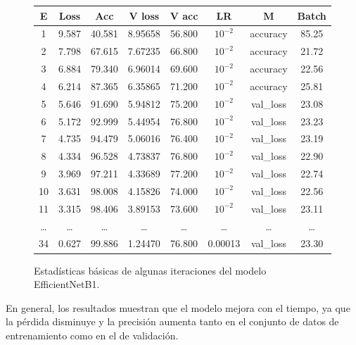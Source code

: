     \begin{figure}[ht]
      \small
      \begin{center}
          \begin{tabular}{|c|c|c|c|c|c|c|c|} \hline
          E & Loss & Acc & V loss & V acc & LR & M & Batch \\ \hline
          1 & 9.587 & 40.581 & 8.95658 & 56.800 & $10^{-2}$ & accuracy & 85.25 \\ \hline
          2 & 7.798 & 67.615 & 7.67235 & 66.800 & $10^{-2}$ & accuracy & 21.72 \\ \hline
          3 & 6.884 & 79.340 & 6.96014 & 69.600 & $10^{-2}$ & accuracy & 22.56 \\ \hline
          4 & 6.214 & 87.365 & 6.35865 & 71.200 & $10^{-2}$ & accuracy & 25.81 \\ \hline
          5 & 5.646 & 91.690 & 5.94812 & 75.200 & $10^{-2}$ & val\_loss & 23.08 \\ \hline
          6 & 5.172 & 92.999 & 5.44954 & 76.800 & $10^{-2}$ & val\_loss & 23.23 \\ \hline
          7 & 4.735 & 94.479 & 5.06016 & 76.400 & $10^{-2}$ & val\_loss & 23.19 \\ \hline
          8 & 4.334 & 96.528 & 4.73837 & 76.800 & $10^{-2}$ & val\_loss & 22.90 \\ \hline
          9 & 3.969 & 97.211 & 4.33689 & 77.200 & $10^{-2}$ & val\_loss & 22.74 \\ \hline
          10 & 3.631 & 98.008 & 4.15826 & 74.000 & $10^{-2}$ & val\_loss & 22.56 \\ \hline
          11 & 3.315 & 98.406 & 3.89153 & 73.600 & $10^{-2}$ & val\_loss & 23.11 \\ \hline
          \dots & \dots & \dots & \dots & \dots & \dots & \dots & \dots \\ \hline
          34 & 0.627 & 99.886 & 1.24470 & 76.800 & 0.00013 & val\_loss & 23.30 \\ \hline
          \end{tabular}
          \caption{Estadísticas básicas de algunas iteraciones del modelo EfficientNetB1.}
      \end{center}\label{fig:estadisticas_p2}
  \end{figure}
    
    En general, los resultados muestran que el modelo mejora con el tiempo, ya que la pérdida disminuye y la precisión aumenta tanto en el conjunto de datos de entrenamiento como en el de validación.

